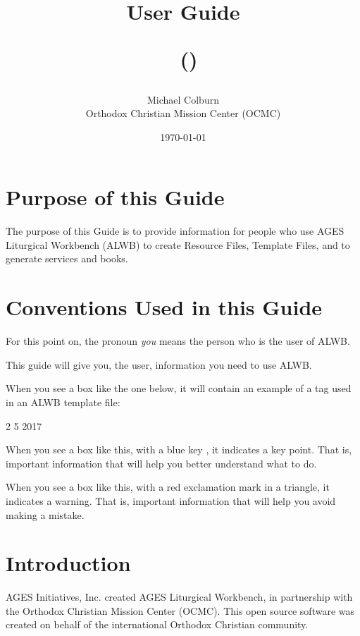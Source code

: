 \documentclass[]{memoir}
\title{User Guide\\\bigskip

\iocDocName\   (\iocDoc) \\\bigskip
}
\author{Michael Colburn\\Orthodox Christian Mission Center (OCMC)}
\date{\today}
\begin{document}
\maketitle
\tableofcontents

\vfill

\pagebreak

\chapter{Purpose of this Guide}

The purpose of this Guide is to provide information for people who use AGES Liturgical Workbench (ALWB) to create Resource Files, Template Files, and to generate services and books.

\chapter{Conventions Used in this Guide}

For this point on, the pronoun \emph{you} means the person who is the user of ALWB.

This guide will give you, the user, information you need to use ALWB.

When you see a box like the one below, it will contain an example of a tag used in an ALWB template file:

\begin{atem}
 2
 5
 2017
\end{atem}

\begin{boxed}
When you see a box like this, with a blue key \color{blue}\faKey{}\color{black}, it indicates a key point.  That is, important information that will help you better understand what to do.
\end{boxed}
\begin{warning}
When you see a box like this, with a red exclamation mark in a triangle, it indicates a warning.  That is, important information that will help you avoid making a mistake.
\end{warning}

\chapter{Introduction}

AGES Initiatives, Inc. created AGES Liturgical Workbench, in partnership with the Orthodox Christian Mission Center (OCMC).  This open source software was created on behalf of the international Orthodox Christian community.  
\end{document}
